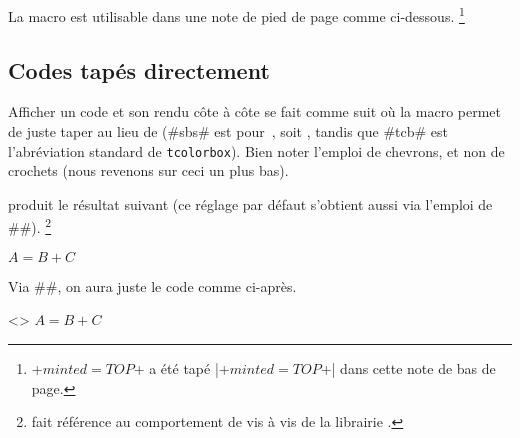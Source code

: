 \documentclass{../main/main}
\begin{document}
\begin{tdocnote}
    La macro  est utilisable dans une note de pied de page comme ci-dessous.%
    \footnote{
        \tdoclatexin+$minted = TOP$+ a été tapé \tdoclatexin|\tdoclatexin+$minted = TOP$+| dans cette note de bas de page.
    }
\end{tdocnote}



\subsection{Codes tapés directement}
\label{tutodoc-listing-latex-direct}

\begin{tdocexa}
    Afficher un code et son rendu côte à côte se fait comme suit où la macro  permet de juste taper  au lieu de  (\tdoclatexin#sbs# est pour \,, soit , tandis que \tdoclatexin#tcb# est l'abréviation standard de \texttt{tcolorbox}). Bien noter l'emploi de chevrons, et non de crochets (nous revenons sur ceci un plus bas).

\end{tdocexa}


\begin{tdocexa}[À la suite]
     produit le résultat suivant (ce réglage par défaut s'obtient aussi via l'emploi de \tdoclatexin##).%
    \footnote{
         fait référence au comportement  de  vis à vis de la librairie .
    }

    \begin{tdoclatex}
$A = B + C$
    \end{tdoclatex}
\end{tdocexa}


\begin{tdocexa}
    Via \tdoclatexin##, on aura juste le code comme ci-après.

    \begin{tdoclatex}<>
$A = B + C$
    \end{tdoclatex}
\end{tdocexa}
\end{document}
